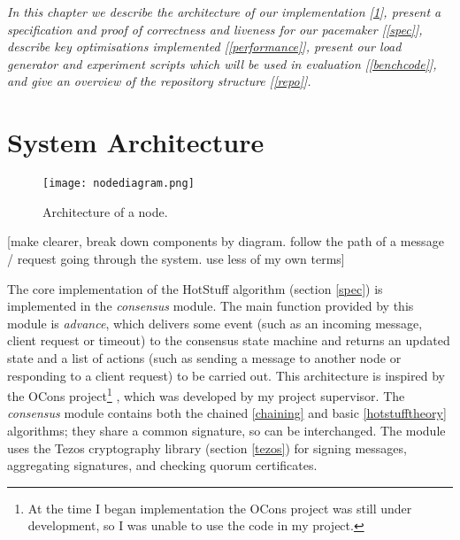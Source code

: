 \textit{In this chapter we describe the architecture of our implementation [\ref{overview}], present a specification and proof of correctness and liveness for our pacemaker [\ref{spec}], describe key optimisations implemented [\ref{performance}], present our load generator and experiment scripts which will be used in evaluation [\ref{benchcode}], and give an overview of the repository structure [\ref{repo}].}

\section{System Architecture} \label{overview}

\begin{figure}[h!]
\centering
\texttt{[image: nodediagram.png]}
\caption{Architecture of a node.}
\label{nodediagram}
\end{figure}

[make clearer, break down components by diagram. follow the path of a message / request going through the system. use less of my own terms]

The core implementation of the HotStuff algorithm (section \ref{spec}) is implemented in the \textit{consensus} module. The main function provided by this module is \textit{advance}, which delivers some event (such as an incoming message, client request or timeout) to the consensus state machine and returns an updated state and a list of actions (such as sending a message to another node or responding to a client request) to be carried out. This architecture is inspired by the OCons project\footnote{At the time I began implementation the OCons project was still under development, so I was unable to use the code in my project.} \cite{jensen_ocons_2023}, which was developed by my project supervisor. The \textit{consensus} module contains both the chained \ref{chaining} and basic \ref{hotstufftheory} algorithms; they share a common signature, so can be interchanged. The module uses the Tezos cryptography library (section \ref{tezos}) for signing messages, aggregating signatures, and checking quorum certificates.

